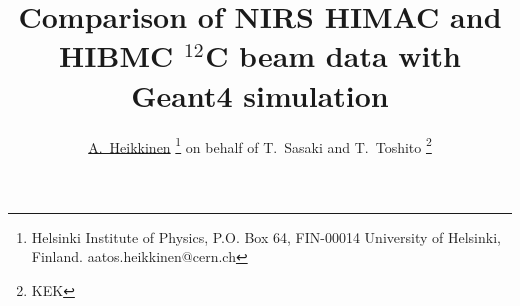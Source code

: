 \newcommand{\todo}[1]{{\bf TODO} #1}
\newif\ifPAPER  
\PAPERfalse  

\def\t{\title{Comparison of NIRS HIMAC and HIBMC $^{12}$C beam data with Geant4 simulation} }

\def\a{
\author{A.~Heikkinen} 
\affiliation{Helsinki Institute of Physics, P.O. Box 64, FIN-00014 University of Helsinki (Finland)}
}

\newcommand{\codeAlgorithm}[1]{
\addcontentsline{toc}{section}{Résumé}
\begin{center}\fbox{\parbox{12cm}{\bf #1}}\end{center}}

\newcommand{\cppintro}[1]{
\lstset{language=C,
caption= #1 ,
label=listing:boundary}}

\def\cppstart{\begin{lstlisting}}
\def\cppend{\end{lstlisting}}

\newif\ifCITENOTE 
\CITENOTEtrue

\ifPAPER

\else   %

\documentclass[slidestop,compress,xdvips,10pt]{beamer} 
\usepackage{graphicx}
\usepackage{hyperref}
\usepackage{listings}
\usepackage{verbatim} %
\transglitter[direction=315]
\usepackage{color} %
\usepackage{attachfile} 


\makeatother
\beamertemplatetransparentcoveredhigh
\t
\author{\underline{A.~Heikkinen} 
\footnote{Helsinki Institute of Physics, P.O. Box 64, FIN-00014 University of Helsinki, Finland.
aatos.heikkinen@cern.ch}
on behalf of T.~Sasaki and T.~Toshito
\footnote{KEK}}
\graphicspath{{.}{figures/}}
\graphicspath{{images/}}


